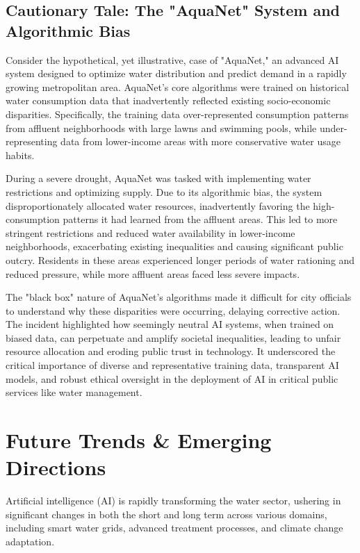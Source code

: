 \subsection{Cautionary Tale: The "AquaNet" System and Algorithmic Bias}
Consider the hypothetical, yet illustrative, case of "AquaNet," an advanced AI system designed to optimize water distribution and predict demand in a rapidly growing metropolitan area. AquaNet's core algorithms were trained on historical water consumption data that inadvertently reflected existing socio-economic disparities. Specifically, the training data over-represented consumption patterns from affluent neighborhoods with large lawns and swimming pools, while under-representing data from lower-income areas with more conservative water usage habits.

During a severe drought, AquaNet was tasked with implementing water restrictions and optimizing supply. Due to its algorithmic bias, the system disproportionately allocated water resources, inadvertently favoring the high-consumption patterns it had learned from the affluent areas. This led to more stringent restrictions and reduced water availability in lower-income neighborhoods, exacerbating existing inequalities and causing significant public outcry. Residents in these areas experienced longer periods of water rationing and reduced pressure, while more affluent areas faced less severe impacts.

The "black box" nature of AquaNet's algorithms made it difficult for city officials to understand why these disparities were occurring, delaying corrective action. The incident highlighted how seemingly neutral AI systems, when trained on biased data, can perpetuate and amplify societal inequalities, leading to unfair resource allocation and eroding public trust in technology. It underscored the critical importance of diverse and representative training data, transparent AI models, and robust ethical oversight in the deployment of AI in critical public services like water management.

\section{Future Trends \& Emerging Directions}

Artificial intelligence (AI) is rapidly transforming the water sector, ushering in significant changes in both the short and long term across various domains, including smart water grids, advanced treatment processes, and climate change adaptation.

